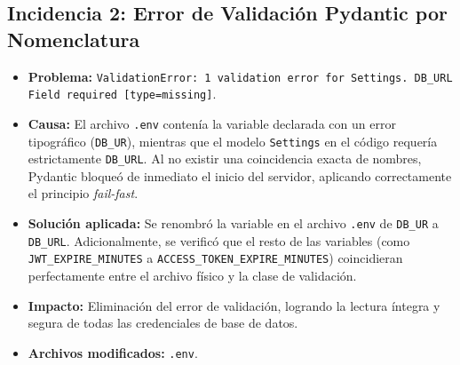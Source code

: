 \documentclass[12pt,a4paper]{article}
\begin{document}
\subsection{Incidencia 2: Error de Validación Pydantic por Nomenclatura}
\begin{itemize}
    \item \textbf{Problema:} \texttt{ValidationError: 1 validation error for Settings. DB\_URL Field required [type=missing]}.
    \item \textbf{Causa:} El archivo \texttt{.env} contenía la variable declarada con un error tipográfico (\texttt{DB\_UR}), mientras que el modelo \texttt{Settings} en el código requería estrictamente \texttt{DB\_URL}. Al no existir una coincidencia exacta de nombres, Pydantic bloqueó de inmediato el inicio del servidor, aplicando correctamente el principio \textit{fail-fast}.
    \item \textbf{Solución aplicada:} Se renombró la variable en el archivo \texttt{.env} de \texttt{DB\_UR} a \texttt{DB\_URL}. Adicionalmente, se verificó que el resto de las variables (como \texttt{JWT\_EXPIRE\_MINUTES} a \texttt{ACCESS\_TOKEN\_EXPIRE\_MINUTES}) coincidieran perfectamente entre el archivo físico y la clase de validación.
    \item \textbf{Impacto:} Eliminación del error de validación, logrando la lectura íntegra y segura de todas las credenciales de base de datos.
    \item \textbf{Archivos modificados:} \texttt{.env}.
\end{itemize}
\end{document}
